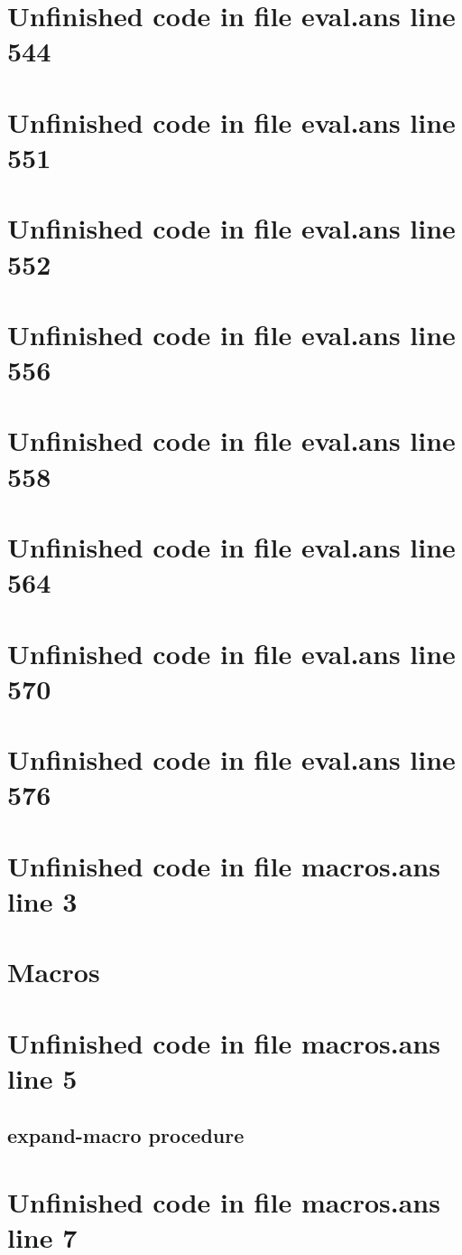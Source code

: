 \documentclass[twoside,9pt]{report}
\begin{document}
\section{Unfinished code in file eval.ans line 544}
\section{Unfinished code in file eval.ans line 551}
\section{Unfinished code in file eval.ans line 552}
\section{Unfinished code in file eval.ans line 556}
\section{Unfinished code in file eval.ans line 558}
\section{Unfinished code in file eval.ans line 564}
\section{Unfinished code in file eval.ans line 570}
\section{Unfinished code in file eval.ans line 576}
\section{Unfinished code in file macros.ans line 3}
\section{Macros}
\label{macros}
\section{Unfinished code in file macros.ans line 5}
\subsection{expand-macro procedure}
\label{expand-macro-procedure}
\section{Unfinished code in file macros.ans line 7}
\end{document}
